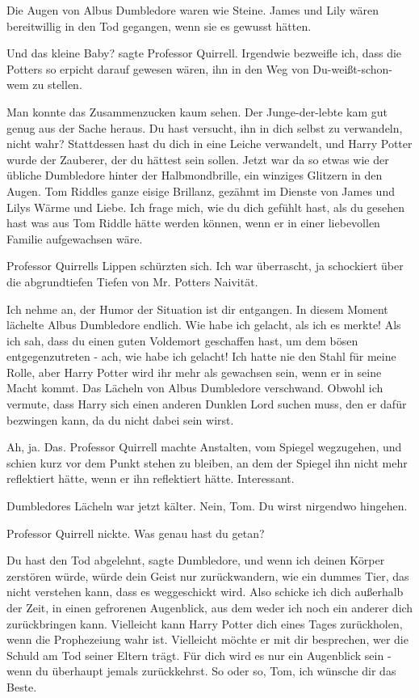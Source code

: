 Die Augen von Albus Dumbledore waren wie Steine. \glqq{}James und Lily wären
bereitwillig in den Tod gegangen, wenn sie es gewusst hätten.\grqq{}

\glqq{}Und das kleine Baby?\grqq{} sagte Professor Quirrell. \glqq{}Irgendwie
bezweifle ich, dass die Potters so erpicht darauf gewesen wären, ihn in den Weg
von Du-weißt-schon-wem zu stellen.\grqq{}

Man konnte das Zusammenzucken kaum sehen. \glqq{}Der Junge-der-lebte kam gut
genug aus der Sache heraus. Du hast versucht, ihn in dich selbst zu verwandeln,
nicht wahr? Stattdessen hast du dich in eine Leiche verwandelt, und Harry Potter
wurde der Zauberer, der du hättest sein sollen.\grqq{} Jetzt war da so etwas wie
der übliche Dumbledore hinter der Halbmondbrille, ein winziges Glitzern in den
Augen. \glqq{}Tom Riddles ganze eisige Brillanz, gezähmt im Dienste von James und
Lilys Wärme und Liebe. Ich frage mich, wie du dich gefühlt hast, als du gesehen
hast was aus Tom Riddle hätte werden können, wenn er in einer liebevollen
Familie aufgewachsen wäre.\grqq{}

Professor Quirrells Lippen schürzten sich. \glqq{}Ich war überrascht, ja
schockiert über die abgrundtiefen Tiefen von Mr. Potters Naivität.\grqq{}

\glqq{}Ich nehme an, der Humor der Situation ist dir entgangen.\grqq{} In diesem
Moment lächelte Albus Dumbledore endlich. \glqq{}Wie habe ich gelacht, als ich es
merkte! Als ich sah, dass du einen guten Voldemort geschaffen hast, um dem bösen
entgegenzutreten - ach, wie habe ich gelacht! Ich hatte nie den Stahl für meine
Rolle, aber Harry Potter wird ihr mehr als gewachsen sein, wenn er in seine
Macht kommt.\grqq{} Das Lächeln von Albus Dumbledore verschwand. \glqq{}Obwohl
ich vermute, dass Harry sich einen anderen Dunklen Lord suchen muss, den er
dafür bezwingen kann, da du nicht dabei sein wirst.\grqq{}

\glqq{}Ah, ja. Das.\grqq{} Professor Quirrell machte Anstalten, vom Spiegel
wegzugehen, und schien kurz vor dem Punkt stehen zu bleiben, an dem der Spiegel
ihn nicht mehr reflektiert hätte, wenn er ihn reflektiert hätte. \glqq{}
Interessant.\grqq{}

Dumbledores Lächeln war jetzt kälter. \glqq{}Nein, Tom. Du wirst nirgendwo
hingehen.\grqq{}

Professor Quirrell nickte. \glqq{}Was genau hast du getan?\grqq{}

\glqq{}Du hast den Tod abgelehnt\grqq{}, sagte Dumbledore, \glqq{}und wenn ich
deinen Körper zerstören würde, würde dein Geist nur zurückwandern, wie ein
dummes Tier, das nicht verstehen kann, dass es weggeschickt wird. Also schicke
ich dich außerhalb der Zeit, in einen gefrorenen Augenblick, aus dem weder ich
noch ein anderer dich zurückbringen kann. Vielleicht kann Harry Potter dich
eines Tages zurückholen, wenn die Prophezeiung wahr ist. Vielleicht möchte er
mit dir besprechen, wer die Schuld am Tod seiner Eltern trägt. Für dich wird es
nur ein Augenblick sein - wenn du überhaupt jemals zurückkehrst. So oder so,
Tom, ich wünsche dir das Beste.\grqq{}

